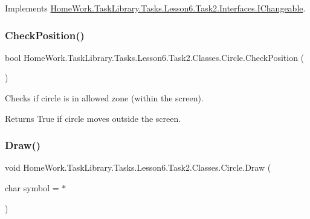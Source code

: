 Implements \mbox{\hyperlink{interface_home_work_1_1_task_library_1_1_tasks_1_1_lesson6_1_1_task2_1_1_interfaces_1_1_i_changeable_a3ec62d87fd0e526760dcf7f929ac74ae}{Home\+Work.\+Task\+Library.\+Tasks.\+Lesson6.\+Task2.\+Interfaces.\+I\+Changeable}}.

\mbox{\label{class_home_work_1_1_task_library_1_1_tasks_1_1_lesson6_1_1_task2_1_1_classes_1_1_circle_a283db57c673ff5f823709a2a5c692d84}} 
\subsubsection{\texorpdfstring{CheckPosition()}{CheckPosition()}}
{\footnotesize\ttfamily bool Home\+Work.\+Task\+Library.\+Tasks.\+Lesson6.\+Task2.\+Classes.\+Circle.\+Check\+Position (\begin{DoxyParamCaption}{ }\end{DoxyParamCaption})\hspace{0.3cm}{\ttfamily [private]}}



Checks if circle is in allowed zone (within the screen). 

\begin{DoxyReturn}{Returns}
True if circle moves outside the screen.
\end{DoxyReturn}
\mbox{\label{class_home_work_1_1_task_library_1_1_tasks_1_1_lesson6_1_1_task2_1_1_classes_1_1_circle_abaa706e9da35ccbbec897327cdf8bbee}} 
\subsubsection{\texorpdfstring{Draw()}{Draw()}}
{\footnotesize\ttfamily void Home\+Work.\+Task\+Library.\+Tasks.\+Lesson6.\+Task2.\+Classes.\+Circle.\+Draw (\begin{DoxyParamCaption}\item[{char}]{symbol = {\ttfamily \textquotesingle{}$\ast$\textquotesingle{}} }\end{DoxyParamCaption})}



